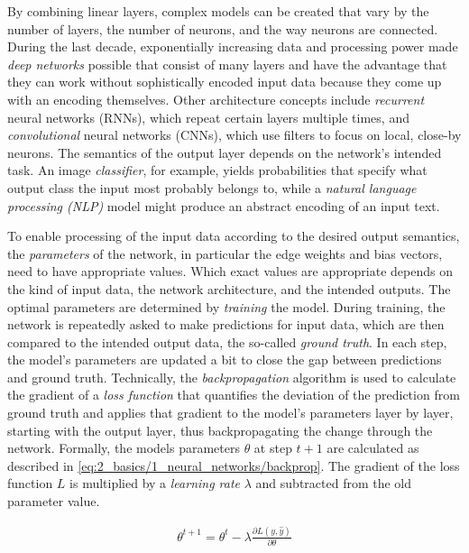 By combining linear layers, complex models can be created that vary by the number of layers, the number of neurons, and the way neurons are connected. During the last decade, exponentially increasing data and processing power made \emph{deep networks} possible that consist of many layers and have the advantage that they can work without sophistically encoded input data because they come up with an encoding themselves. Other architecture concepts include \emph{recurrent} neural networks (RNNs), which repeat certain layers multiple times, and \emph{convolutional} neural networks (CNNs), which use filters to focus on local, close-by neurons. The semantics of the output layer depends on the network's intended task. An image \emph{classifier}, for example, yields probabilities that specify what output class the input most probably belongs to, while a \emph{natural language processing (NLP)} model might produce an abstract encoding of an input text.

To enable processing of the input data according to the desired output semantics, the \emph{parameters} of the network, in particular the edge weights and bias vectors, need to have appropriate values. Which exact values are appropriate depends on the kind of input data, the network architecture, and the intended outputs. The optimal parameters are determined by \emph{training} the model. During training, the network is repeatedly asked to make predictions for input data, which are then compared to the intended output data, the so-called \emph{ground truth}. In each step, the model's parameters are updated a bit to close the gap between predictions and ground truth. Technically, the \emph{backpropagation} algorithm is used to calculate the gradient of a \emph{loss function} that quantifies the deviation of the prediction from ground truth and applies that gradient to the model's parameters layer by layer, starting with the output layer, thus backpropagating the change through the network. Formally, the models parameters $\theta$ at step $t+1$ are calculated as described in \autoref{eq:2_basics/1_neural_networks/backprop}. The gradient of the loss function $L$ is multiplied by a \emph{learning rate} $\lambda$ and subtracted from the old parameter value.

\begin{align}
    \theta^{t+1} = \theta^t - \lambda \frac{\partial L(y, \hat{y})}{\partial \theta}
    \label{eq:2_basics/1_neural_networks/backprop}
\end{align}

